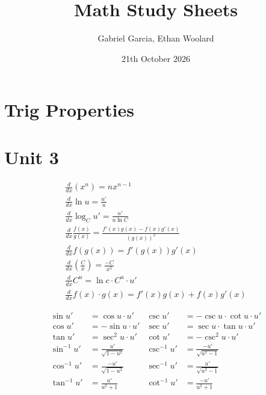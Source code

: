 \documentclass{article}
\title{Math Study Sheets}
\author{Gabriel Garcia, Ethan Woolard}
\date{21th October 2026}
\begin{document}
\maketitle
\section*{Trig Properties}

\section*{Unit 3}
\begin{minipage}[t]{0.45\textwidth}
    \centering
    \begin{gather}
        \frac{d}{dx} (x^n)=nx^{n-1} \\
        \frac{d}{dx} \ln u=\frac{u'}{u} \\
        \frac{d}{dx} \log_{C}u'=\frac{u'}{u\ln C} \\
        \frac{d}{dx} \frac{f(x)}{g(x)} = \frac{f'(x)g(x)-f(x)g'(x)}{(g(x))^2} \\
        \frac{d}{dx} f(g(x)) = f'(g(x))g'(x) \\
        \frac{d}{dx} \left(\frac{C}{x}\right) = \frac{-C}{x^2} \\
        \frac{d}{dx} C^u = \ln{c} \cdot C^u \cdot u' \\
        \frac{d}{dx} f(x) \cdot g(x) = f'(x)g(x) + f(x)g'(x)
    \end{gather}  
\end{minipage}
\hfill
\begin{minipage}[t]{0.45\textwidth}
    \centering
    \begin{align*}
        \sin u' &= \cos u \cdot u' & \csc u' &= -\csc u \cdot \cot u \cdot u' \\
        \cos u' &= -\sin u \cdot u' & \sec u' &= \sec u \cdot \tan u \cdot u' \\
        \tan u' &= \sec^2 u \cdot u' & \cot u' &= -\csc^2 u \cdot u' \\
        \sin^{-1} u' &= \frac{u'}{\sqrt{1-u^2}} & \csc^{-1} u' &= \frac{-u'}{\sqrt{u^2-1}} \\
        \cos^{-1} u' &= \frac{-u'}{\sqrt{1-u^2}} & \sec^{-1} u' &= \frac{u'}{\sqrt{u^2-1}} \\
        \tan^{-1} u' &= \frac{u'}{u^2+1} & \cot^{-1} u' &= \frac{-u'}{u^2+1}
    \end{align*}
\end{minipage}
\newline
\end{document}
